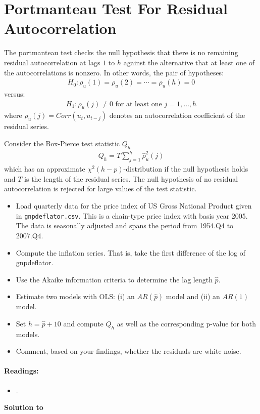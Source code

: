 \section[Portmanteau Test For Residual Autocorrelation]{Portmanteau Test For Residual Autocorrelation\label{ex:PortmanteauTestResidualAutocorrelation}}
The portmanteau test checks the null hypothesis
  that there is no remaining residual autocorrelation at lags \(1\) to \(h\)
  against the alternative that at least one of the autocorrelations is nonzero.
In other words, the pair of hypotheses:
\begin{align*}
H_0:\rho_u(1)=\rho_u(2)=\cdots =\rho_u(h) = 0
\end{align*}
versus:
\begin{align*}
H_1: \rho_u(j) \neq 0 \text{~for at least one~} j=1,\ldots ,h
\end{align*}
where \(\rho_u(j) = Corr(u_t, u_{t-j})\) denotes an autocorrelation coefficient of the residual series.

Consider the Box-Pierce test statistic \(Q_h\)
\begin{align*}
Q_h = T \sum_{j=1}^h \hat{\rho}^2_u(j)
\end{align*}
which has an approximate \(\chi^2(h-p)\)-distribution if the null hypothesis holds
  and \(T\) is the length of the residual series.
The null hypothesis of no residual autocorrelation is rejected for large values of the test statistic.

\begin{itemize}
 	\item Load quarterly data for the price index of US Gross National Product given in \texttt{gnpdeflator.csv}.
    This is a chain-type price index with basis year 2005.
    The data is seasonally adjusted and spans the period from 1954.Q4 to 2007.Q4.
 	\item Compute the inflation series.
    That is, take the first difference of the log of gnpdeflator.
 	\item Use the Akaike information criteria to determine the lag length \(\hat{p}\).
 	\item Estimate two models with OLS:
    (i) an \(AR(\hat{p})\) model and
    (ii) an \(AR(1)\) model.
 	\item Set \(h=\hat{p}+10\) and compute \(Q_h\) as well as the corresponding p-value for both models.
 	\item Comment, based on your findings, whether the residuals are white noise.
\end{itemize}

\paragraph{Readings:}
\begin{itemize}
	\item \textcite{Lutkepohl_2004_UnivariateTimeSeries}.
\end{itemize}

\begin{solution}\textbf{Solution to }
\ifDisplaySolutions

\fi
\newpage
\end{solution}